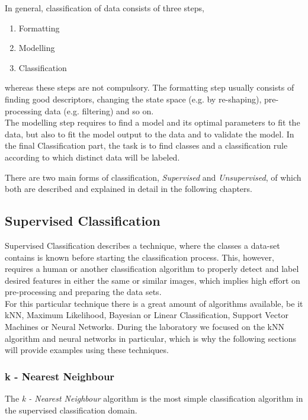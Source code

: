 In general, classification of data consists of three steps,
\begin{enumerate}
	\item Formatting
	\item Modelling
	\item Classification
\end{enumerate}
whereas these steps are not compulsory. The formatting step usually consists of finding good descriptors, changing the state space (e.g. by re-shaping), pre-processing data (e.g. filtering) and so on.\\
The modelling step requires to find a model and its optimal parameters to fit the data, but also to fit the model output to the data and to validate the model.
In the final Classification part, the task is to find classes and a classification rule according to which distinct data will be labeled.

There are two main forms of classification, \textit{Supervised} and \textit{Unsupervised}, of which both are described and explained in detail in the following chapters.


\subsection{Supervised Classification}
Supervised Classification describes a technique, where the classes a data-set contains is known before starting the classification process. This, however, requires a human or another classification algorithm to properly detect and label desired features in either the same or similar images, which implies high effort on pre-processing and preparing the data sets.\\
For this particular technique there is a great amount of algorithms available, be it kNN, Maximum Likelihood, Bayesian or Linear Classification, Support Vector Machines or Neural Networks. During the laboratory we focused on the kNN algorithm and neural networks in particular, which is why the following sections will provide examples using these techniques.

\subsubsection{k - Nearest Neighbour}
\label{sssec:knn}
The \textit{k - Nearest Neighbour} algorithm is the most simple classification algorithm in the supervised classification domain. 

